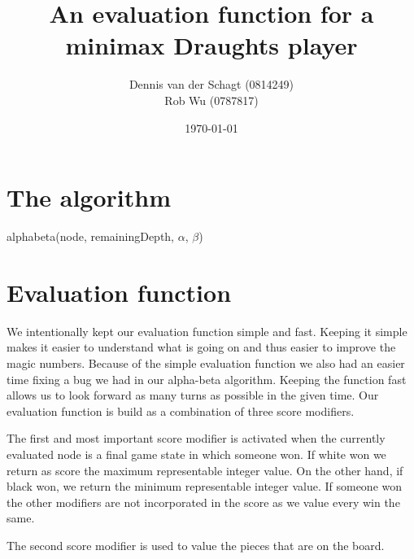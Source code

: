 \documentclass[11pt,a4paper]{article}
\title{An evaluation function for a minimax Draughts player}
\author{
Dennis van der Schagt (0814249)\\
Rob Wu (0787817)
}
\date{\today}
\begin{document}
\maketitle
\newpage
\section{The algorithm}

\begin{function}[H]
	\DontPrintSemicolon
	\caption{alphabeta(node, remainingDepth, $\alpha$, $\beta$)}
\end{function}

\section{Evaluation function}
We intentionally kept our evaluation function simple and fast. Keeping it simple makes it easier to understand what is going on and thus easier to improve the magic numbers. Because of the simple evaluation function we also had an easier time fixing a bug we had in our alpha-beta algorithm. Keeping the function fast allows us to look forward as many turns as possible in the given time. Our evaluation function is build as a combination of three score modifiers.

The first and most important score modifier is activated when the currently evaluated node is a final game state in which someone won. If white won we return as score the maximum representable integer value. On the other hand, if black won, we return the minimum representable integer value. If someone won the other modifiers are not incorporated in the score as we value every win the same.

The second score modifier is used to value the pieces that are on the board.
\end{document}
